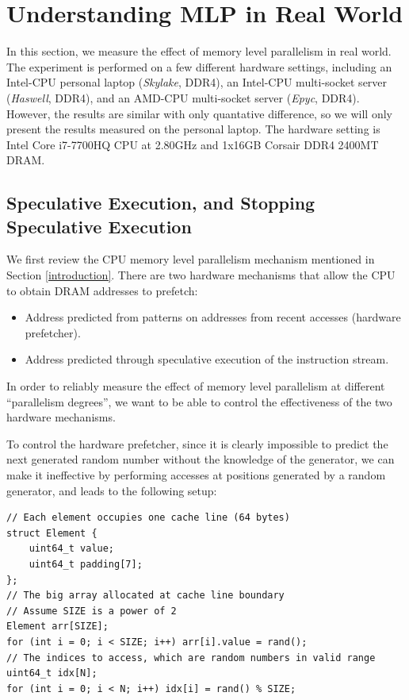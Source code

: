 \documentclass[11pt, usletter]{article}
\begin{document}
\section{Understanding MLP in Real World} \label{understandmlp}

In this section, we measure the effect of memory level parallelism in real world. 
The experiment is performed on a few different hardware settings, 
including an Intel-CPU personal laptop (\textit{Skylake}, DDR4), 
an Intel-CPU multi-socket server (\textit{Haswell}, DDR4), and an AMD-CPU multi-socket server (\textit{Epyc}, DDR4).
However, the results are similar with only quantative difference, 
so we will only present the results measured on the personal laptop.
The hardware setting is Intel Core i7-7700HQ CPU at 2.80GHz and 1x16GB Corsair DDR4 2400MT DRAM.
 
\subsection{Speculative Execution, and Stopping Speculative Execution} \label{specexec}
We first review the CPU memory level parallelism mechanism mentioned in Section \ref{introduction}.
There are two hardware mechanisms that allow the CPU to obtain DRAM addresses to prefetch:
\begin{itemize}
[topsep=0pt,partopsep=0pt,itemsep=0pt,parsep=0pt,fullwidth,itemindent=\parindent,listparindent=\parindent]
\item Address predicted from patterns on addresses from recent accesses (hardware prefetcher).
\item Address predicted through speculative execution of the instruction stream.
\end{itemize}
In order to reliably measure the effect of memory level parallelism at different ``parallelism degrees'', 
we want to be able to control the effectiveness of the two hardware mechanisms.

To control the hardware prefetcher, 
since it is clearly impossible to predict the next generated random number without the knowledge of the generator,
we can make it ineffective by performing accesses at positions generated by a random generator, 
and leads to the following setup:

\singlespacing\begin{codebox}
\begin{verbatim}
// Each element occupies one cache line (64 bytes)
struct Element {
    uint64_t value;
    uint64_t padding[7];
};	
// The big array allocated at cache line boundary
// Assume SIZE is a power of 2
Element arr[SIZE];
for (int i = 0; i < SIZE; i++) arr[i].value = rand();	
// The indices to access, which are random numbers in valid range
uint64_t idx[N];
for (int i = 0; i < N; i++) idx[i] = rand() % SIZE;
\end{verbatim}
\end{codebox}\doublespacing
\end{document}

